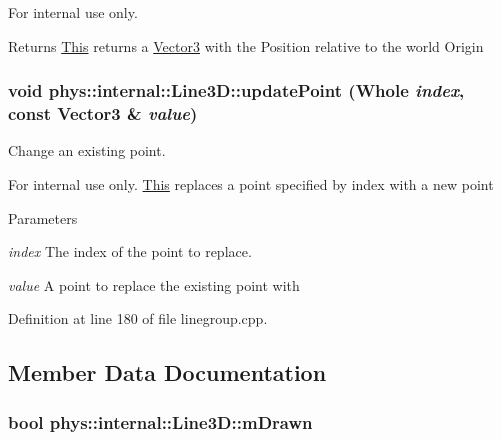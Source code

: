 \begin{DoxyInternal}{For internal use only.}
\begin{DoxyReturn}{Returns}
\hyperlink{structThis}{This} returns a \hyperlink{classphys_1_1Vector3}{Vector3} with the Position relative to the world Origin 
\end{DoxyReturn}
\end{DoxyInternal}
\hypertarget{classphys_1_1internal_1_1Line3D_a4b2dec1619e4456ab0cb034ad34eb9d1}{
\subsubsection[{updatePoint}]{\setlength{\rightskip}{0pt plus 5cm}void phys::internal::Line3D::updatePoint ({\bf Whole} {\em index}, \/  const {\bf Vector3} \& {\em value})}}
\label{d4/db5/classphys_1_1internal_1_1Line3D_a4b2dec1619e4456ab0cb034ad34eb9d1}


Change an existing point. 

\begin{DoxyInternal}{For internal use only.}
\hyperlink{structThis}{This} replaces a point specified by index with a new point 
\begin{DoxyParams}{Parameters}
\item[{\em index}]The index of the point to replace. \item[{\em value}]A point to replace the existing point with \end{DoxyParams}
\end{DoxyInternal}


Definition at line 180 of file linegroup.cpp.



\subsection{Member Data Documentation}
\hypertarget{classphys_1_1internal_1_1Line3D_a7f3a190db3c0cd83ff4fdf3d95d6f0ee}{
\subsubsection[{mDrawn}]{\setlength{\rightskip}{0pt plus 5cm}bool {\bf phys::internal::Line3D::mDrawn}}}
\label{d4/db5/classphys_1_1internal_1_1Line3D_a7f3a190db3c0cd83ff4fdf3d95d6f0ee}


